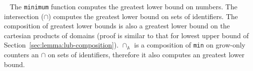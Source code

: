 \documentclass[9pt]{article}   	%
\begin{document}
\pfsketch~	The \texttt{minimum} function computes the greatest lower bound on numbers. The intersection ($\cap$) computes the greatest lower bound on sets of identifiers. The composition of greatest lower bounds is also a greatest lower bound on the cartesian products of domains (proof is similar to that for lowest upper bound of Section~\ref{sec:lemma:lub-composition}). $\cap_\mathds{A}$ is a composition of \texttt{min} on grow-only counters an $\cap$ on sets of identifiers, therefore it also computes an greatest lower bound.
\end{document}
